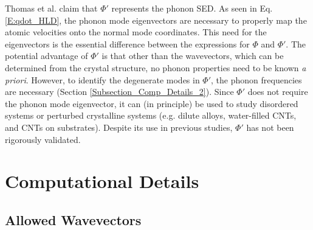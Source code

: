 \documentclass[aps,prb,preprint,superscriptaddress,amsmath,amssymb,floatfix]{revtex4}
\begin{document}
Thomas et al. \cite{thomas2010c} claim that $\Phi'$ represents the phonon SED. As seen in Eq$.$ \eqref{E:qdot_HLD}, the phonon mode eigenvectors are necessary to properly map the atomic velocities onto the normal mode coordinates. This need for the eigenvectors is the essential difference between the expressions for $\Phi$ and $\Phi'$. The potential advantage of $\Phi'$ is that other than the wavevectors, which can be determined from the crystal structure, no phonon properties need to be known {\em a priori}. However, to identify the degenerate modes in $\Phi'$, the phonon frequencies are necessary (Section \ref{Subsection_Comp_Details_2}). Since $\Phi'$ does not require the phonon mode eigenvector, it can (in principle) be used to study disordered systems or perturbed crystalline systems (e.g. dilute alloys,\cite{shiomi2011a} water-filled CNTs,\cite{thomas2010c} and CNTs on substrates\cite{shiomi2011b}). Despite its use in previous studies, $\Phi'$ has not been rigorously validated.

\section{\label{Section_Comp}Computational Details}

\subsection{\label{Subsection_Comp_Details_1}Allowed Wavevectors}
\end{document}
